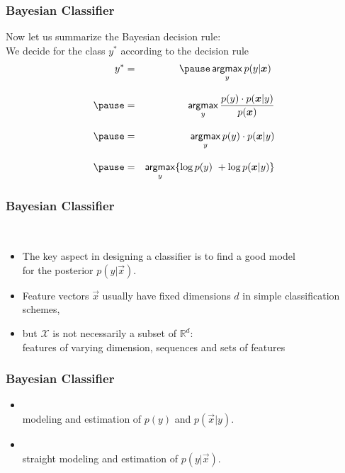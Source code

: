 

\begin{frame}
	\frametitle{Bayesian Classifier \cont}

	Now let us summarize the Bayesian decision rule:\\[.3cm]
	We decide for the class $y^*$ according to the decision rule
	\begin{eqnarray*}
		y^* &=& \pause \argmax\limits_{y} p(y | \vec x)\ \\[.3cm] \pause
		&=& \argmax\limits_{y} \frac{p(y) \cdot p(\vec x | y)}{p(\vec x)} \\[.3cm] \pause
		&=& \argmax\limits_{y} p(y) \cdot p(\vec x | y) \\[.3cm] \pause
		&=& \argmax\limits_{y} \{\log p(y)\ + \log p(\vec x | y)\}
	\end{eqnarray*}
\end{frame}


\begin{frame}
	\frametitle{Bayesian Classifier \cont}

	 \\[.3cm]

	\begin{itemize}
		\item The key aspect in designing a classifier is to find a good model \\
		      for the posterior $p(y|\vec x)$. \\[.3cm]
		\item Feature vectors $\vec x$ usually have fixed dimensions $d$ in simple classification schemes, \\[.3cm]
		\item but ${\mathcal{X}}$ is not necessarily a subset of $\mathbb{R}^d$: \\
		      features of varying dimension, sequences and sets of features
	\end{itemize}
\end{frame}


\begin{frame}
	\frametitle{Bayesian Classifier \cont}

	\begin{itemize}
		\item {} \\
		      modeling and estimation of $p(y)$ and $p(\vec x | y)$. \\[.5cm]
		\item {} \\
		      straight modeling and estimation of $p(y|\vec x)$.
	\end{itemize}
\end{frame}


